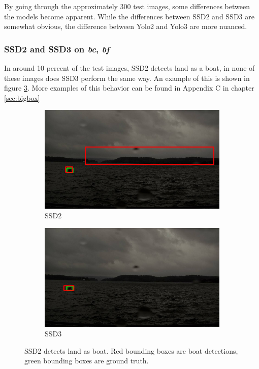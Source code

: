 \vspace{3mm}

By going through the approximately 300 test images, some differences between the models become apparent. While the differences between SSD2 and SSD3 are somewhat obvious, the difference between Yolo2 and Yolo3 are more nuanced. 

\subsubsection{SSD2 and SSD3 on \textit{bc}, \textit{bf}}
In around 10 percent of the test images, SSD2 detects land as a boat, in none of these images does SSD3 perform the same way. An example of this is shown in figure \ref{img:bixbox_ssd}. More examples of this behavior can be found in Appendix C in chapter \ref{sec:bigbox}

\begin{figure}[h!]
\begin{subfigure}{.5\textwidth}
  \centering
  \includegraphics[width=0.9\linewidth]{results/case_buildings/bigbox_bcbf/SSD2/selected_06_14_axis0049.jpg}
  \caption{SSD2}
  \label{fig:big_box_ssd2}
\end{subfigure}%
\begin{subfigure}{.5\textwidth}
  \centering
  \includegraphics[width=.9\linewidth]{results/case_buildings/bigbox_bcbf/SSD3/selected_06_14_axis0049.jpg}
  \caption{SSD3}
  \label{fig:big_box_ssd3}
\end{subfigure}
\caption{SSD2 detects land as boat. Red bounding boxes are boat detections, green bounding boxes are ground truth.}
\label{img:bixbox_ssd}
\end{figure}

